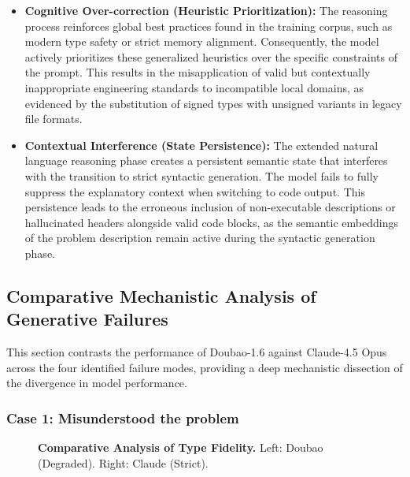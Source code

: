 \documentclass{article}
\theoremstyle{plain}
\theoremstyle{definition}
\theoremstyle{remark}
\begin{document}
\begin{itemize}
    \item \textbf{Cognitive Over-correction (Heuristic Prioritization):} The reasoning process reinforces global best practices found in the training corpus, such as modern type safety or strict memory alignment. Consequently, the model actively prioritizes these generalized heuristics over the specific constraints of the prompt. This results in the misapplication of valid but contextually inappropriate engineering standards to incompatible local domains, as evidenced by the substitution of signed types with unsigned variants in legacy file formats.
    
    \item \textbf{Contextual Interference (State Persistence):} The extended natural language reasoning phase creates a persistent semantic state that interferes with the transition to strict syntactic generation. The model fails to fully suppress the explanatory context when switching to code output. This persistence leads to the erroneous inclusion of non-executable descriptions or hallucinated headers alongside valid code blocks, as the semantic embeddings of the problem description remain active during the syntactic generation phase.
\end{itemize}

\subsection{Comparative Mechanistic Analysis of Generative Failures}
\label{sec:comparative_analysis}

This section contrasts the performance of Doubao-1.6 against Claude-4.5 Opus across the four identified failure modes, providing a deep mechanistic dissection of the divergence in model performance.

\subsubsection{Case 1: Misunderstood the problem}
\begin{figure}[H]
    \centering
    \caption{\textbf{Comparative Analysis of Type Fidelity.} Left: Doubao (Degraded). Right: Claude (Strict).}
    \label{fig:compare_1}
\end{figure}
\end{document}
